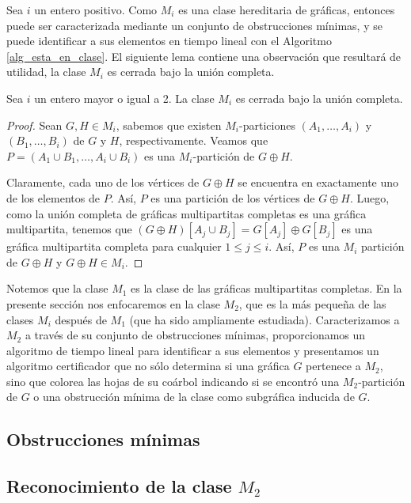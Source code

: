 Sea $i$ un entero positivo. Como $M_i$ es una clase hereditaria de gráficas,
entonces puede ser caracterizada mediante un conjunto de obstrucciones
mínimas, y se puede identificar a sus elementos en tiempo lineal con el
Algoritmo \ref{alg_esta_en_clase}. El siguiente lema contiene una
observaci\'on que resultar\'a de utilidad, la clase $M_i$ es cerrada bajo
la unión completa.

\begin{lemma}
\label{lema_union_completa}
Sea $i$ un entero mayor o igual a 2.  La clase $M_i$ es cerrada bajo
la unión completa.
\end{lemma}

\begin{proof}
Sean $G,H \in M_i$, sabemos que existen $M_i$-particiones $(A_1, \dots,
A_i)$ y $(B_1, \dots, B_i)$ de $G$ y $H$, respectivamente. Veamos que $P
= (A_1 \cup B_1, \dots, A_i \cup B_i)$ es una $M_i$-partición de $G \oplus H$.

Claramente, cada uno de los vértices de $G \oplus H$ se encuentra en
exactamente uno de los elementos de $P$. Así, $P$ es una partición de los
vértices de $G \oplus H$. Luego, como la unión completa de gráficas
multipartitas completas es una gráfica multipartita, tenemos que $(G \oplus
H)[A_j \cup B_j] = G[A_j] \oplus G[B_j]$ es una gráfica multipartita completa
para cualquier $1 \le j \le i$. Así, $P$ es una $M_i$ partición de $G \oplus
H$ y $G \oplus H \in M_i$.
\end{proof}

Notemos que la clase $M_1$ es la clase de las gráficas multipartitas
completas. En la presente sección nos enfocaremos en la clase $M_2$, que
es la más pequeña de las clases $M_i$ después de $M_1$ (que ha sido
ampliamente estudiada). Caracterizamos a $M_2$ a través de su conjunto de
obstrucciones mínimas, proporcionamos un algoritmo de tiempo lineal para
identificar a sus elementos y presentamos un algoritmo certificador que no
sólo determina si una gráfica $G$ pertenece a $M_2$, sino que colorea las
hojas de su coárbol indicando si se encontró una $M_2$-partición de $G$ o
una obstrucción mínima de la clase como subgráfica inducida de $G$.

    \subsection{Obstrucciones mínimas}
        

    \subsection{Reconocimiento de la clase $M_2$}
        

